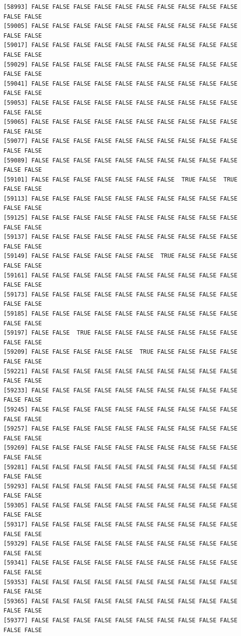 \documentclass[
  a4paper,
  DIV=11,
  numbers=noendperiod]{scrartcl}
\begin{document}
\begin{verbatim}
[58993] FALSE FALSE FALSE FALSE FALSE FALSE FALSE FALSE FALSE FALSE FALSE FALSE
[59005] FALSE FALSE FALSE FALSE FALSE FALSE FALSE FALSE FALSE FALSE FALSE FALSE
[59017] FALSE FALSE FALSE FALSE FALSE FALSE FALSE FALSE FALSE FALSE FALSE FALSE
[59029] FALSE FALSE FALSE FALSE FALSE FALSE FALSE FALSE FALSE FALSE FALSE FALSE
[59041] FALSE FALSE FALSE FALSE FALSE FALSE FALSE FALSE FALSE FALSE FALSE FALSE
[59053] FALSE FALSE FALSE FALSE FALSE FALSE FALSE FALSE FALSE FALSE FALSE FALSE
[59065] FALSE FALSE FALSE FALSE FALSE FALSE FALSE FALSE FALSE FALSE FALSE FALSE
[59077] FALSE FALSE FALSE FALSE FALSE FALSE FALSE FALSE FALSE FALSE FALSE FALSE
[59089] FALSE FALSE FALSE FALSE FALSE FALSE FALSE FALSE FALSE FALSE FALSE FALSE
[59101] FALSE FALSE FALSE FALSE FALSE FALSE FALSE  TRUE FALSE  TRUE FALSE FALSE
[59113] FALSE FALSE FALSE FALSE FALSE FALSE FALSE FALSE FALSE FALSE FALSE FALSE
[59125] FALSE FALSE FALSE FALSE FALSE FALSE FALSE FALSE FALSE FALSE FALSE FALSE
[59137] FALSE FALSE FALSE FALSE FALSE FALSE FALSE FALSE FALSE FALSE FALSE FALSE
[59149] FALSE FALSE FALSE FALSE FALSE FALSE  TRUE FALSE FALSE FALSE FALSE FALSE
[59161] FALSE FALSE FALSE FALSE FALSE FALSE FALSE FALSE FALSE FALSE FALSE FALSE
[59173] FALSE FALSE FALSE FALSE FALSE FALSE FALSE FALSE FALSE FALSE FALSE FALSE
[59185] FALSE FALSE FALSE FALSE FALSE FALSE FALSE FALSE FALSE FALSE FALSE FALSE
[59197] FALSE FALSE  TRUE FALSE FALSE FALSE FALSE FALSE FALSE FALSE FALSE FALSE
[59209] FALSE FALSE FALSE FALSE FALSE  TRUE FALSE FALSE FALSE FALSE FALSE FALSE
[59221] FALSE FALSE FALSE FALSE FALSE FALSE FALSE FALSE FALSE FALSE FALSE FALSE
[59233] FALSE FALSE FALSE FALSE FALSE FALSE FALSE FALSE FALSE FALSE FALSE FALSE
[59245] FALSE FALSE FALSE FALSE FALSE FALSE FALSE FALSE FALSE FALSE FALSE FALSE
[59257] FALSE FALSE FALSE FALSE FALSE FALSE FALSE FALSE FALSE FALSE FALSE FALSE
[59269] FALSE FALSE FALSE FALSE FALSE FALSE FALSE FALSE FALSE FALSE FALSE FALSE
[59281] FALSE FALSE FALSE FALSE FALSE FALSE FALSE FALSE FALSE FALSE FALSE FALSE
[59293] FALSE FALSE FALSE FALSE FALSE FALSE FALSE FALSE FALSE FALSE FALSE FALSE
[59305] FALSE FALSE FALSE FALSE FALSE FALSE FALSE FALSE FALSE FALSE FALSE FALSE
[59317] FALSE FALSE FALSE FALSE FALSE FALSE FALSE FALSE FALSE FALSE FALSE FALSE
[59329] FALSE FALSE FALSE FALSE FALSE FALSE FALSE FALSE FALSE FALSE FALSE FALSE
[59341] FALSE FALSE FALSE FALSE FALSE FALSE FALSE FALSE FALSE FALSE FALSE FALSE
[59353] FALSE FALSE FALSE FALSE FALSE FALSE FALSE FALSE FALSE FALSE FALSE FALSE
[59365] FALSE FALSE FALSE FALSE FALSE FALSE FALSE FALSE FALSE FALSE FALSE FALSE
[59377] FALSE FALSE FALSE FALSE FALSE FALSE FALSE FALSE FALSE FALSE FALSE FALSE

\end{verbatim}
\end{document}
